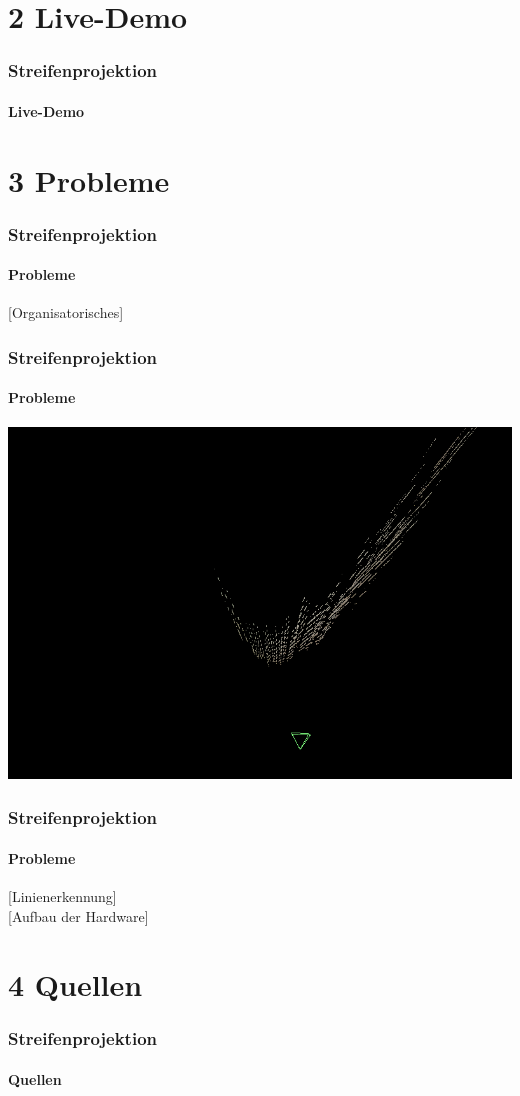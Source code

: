 \documentclass{beamer}
\begin{document}
\section{2 \hspace{5px} Live-Demo} 
\begin{frame}
	\frametitle{Streifenprojektion}
	\framesubtitle{Live-Demo}

\end{frame}


\section{3 \hspace{5px} Probleme}
\begin{frame}
	\frametitle{Streifenprojektion}
	\framesubtitle{Probleme}

	[Organisatorisches]

\end{frame}


\begin{frame}
	\frametitle{Streifenprojektion}
	\framesubtitle{Probleme}

	\includegraphics[width=\linewidth]{includes/krumm.png}

\end{frame}

\begin{frame}
	\frametitle{Streifenprojektion}
	\framesubtitle{Probleme}

	[Linienerkennung] \\

	[Aufbau der Hardware]

\end{frame}


\section{4 \hspace{5px} Quellen} 
\begin{frame}
	\frametitle{Streifenprojektion}
	\framesubtitle{Quellen}
	
\end{frame}
\end{document}
